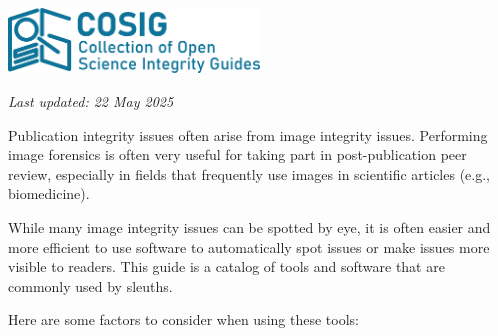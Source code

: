\documentclass[letterpaper, 12pt]{article}
\begin{document}
\flushleft\includegraphics[width=0.5\textwidth]{img/home/241017_final_logo_mockup.png}

\textit{Last updated: 22 May 2025}

Publication integrity issues often arise from image integrity issues. Performing image forensics is often very useful for taking part in post-publication peer review, especially in fields that frequently use images in scientific articles (e.g., biomedicine).

While many image integrity issues can be spotted by eye, it is often easier and more efficient to use software to automatically spot issues or make issues more visible to readers. This guide is a catalog of tools and software that are commonly used by sleuths.

Here are some factors to consider when using these tools:
\end{document}
